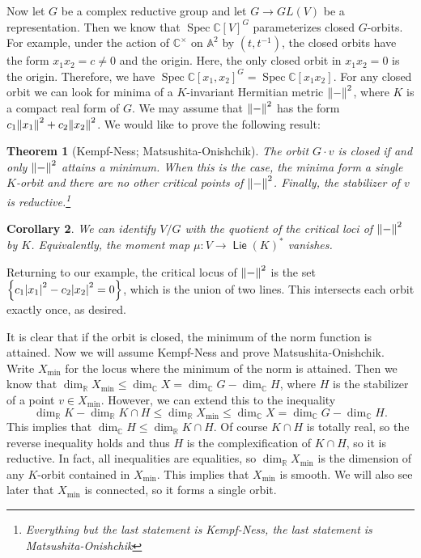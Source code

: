 \documentclass[leqno, openany]{memoir}
\newtheorem{thm}{Theorem}[section]
\newtheorem{cor}[thm]{Corollary}
\theoremstyle{definition}
\theoremstyle{remark}
\theoremstyle{plain}
\theoremstyle{definition}
\theoremstyle{remark}
\newcommand{\A}{\mathbb{A}}
\newcommand{\R}{\mathbb{R}}
\newcommand{\C}{\mathbb{C}}
\DeclareMathOperator{\Spec}{Spec}
\DeclareMathOperator{\Lie}{\mathsf{Lie}}
\begin{document}
Now let $G$ be a complex reductive group and let $G \to GL(V)$ be a
representation. Then we know that $\Spec {\C[V]}^G$ parameterizes closed
$G$-orbits. For example, under the action of $\C^{\times}$ on $\A^2$ by $(t,
t^{-1})$, the closed orbits have the form $x_1x_2 = c \neq 0$ and the origin.
Here, the only closed orbit in $x_1x_2 = 0$ is the origin. Therefore, we have
$\Spec {\C[x_1,x_2]}^G = \Spec \C[x_1x_2]$. For any closed orbit we can look
for minima of a $K$-invariant Hermitian metric $\norm{-}^2$, where $K$ is a
compact real form of $G$. We may assume that $\norm{-}^2$ has the form $c_1
\norm{x_1}^2 + c_2 \norm{x_2}^2$. We would like to prove the following result:

\begin{thm}[Kempf-Ness; Matsushita-Onishchik] The orbit $G\cdot v$ is closed if
    and only $\norm{-}^2$ attains a minimum. When this is the case, the minima
    form a single $K$-orbit and there are no other critical points of
    $\norm{-}^2$. Finally, the stabilizer of $v$ is
    reductive.\footnote{Everything but the last statement is Kempf-Ness, the
    last statement is Matsushita-Onishchik} \end{thm}

\begin{cor} We can identify $V/G$ with the quotient of the critical loci of
$\norm{-}^2$ by $K$. Equivalently, the moment map $\mu \colon V \to
{\Lie(K)}^*$ vanishes.  \end{cor}

Returning to our example, the critical locus of $\norm{-}^2$ is the set
$\qty{c_1 \abs{x_1}^2 - c_2 \abs{x_2}^2 = 0}$, which is the union of two lines.
This intersects each orbit exactly once, as desired.

It is clear that if the orbit is closed, the minimum of the norm function is
attained. Now we will assume Kempf-Ness and prove Matsushita-Onishchik. Write
$X_{\min}$ for the locus where the minimum of the norm is attained. Then we
know that $\dim_{\R} X_{\min} \leq \dim_{\C} X = \dim_{\C} G - \dim_{\C} H$,
where $H$ is the stabilizer of a point $v \in X_{\min}$. However, we can extend
this to the inequality \[ \dim_{\R} K - \dim_{\R} K \cap H \leq \dim_{\R}
X_{\min} \leq \dim_{\C} X = \dim_{\C} G - \dim_{\C} H. \] This implies that
$\dim_{\C} H \leq \dim_{\R} K \cap H$. Of course $K \cap H$ is totally real, so
the reverse inequality holds and thus $H$ is the complexification of $K \cap
H$, so it is reductive. In fact, all inequalities are equalities, so $\dim_{\R}
X_{\min}$ is the dimension of any $K$-orbit contained in $X_{\min}$. This
implies that $X_{\min}$ is smooth. We will also see later that $X_{\min}$ is
connected, so it forms a single orbit.
\end{document}
